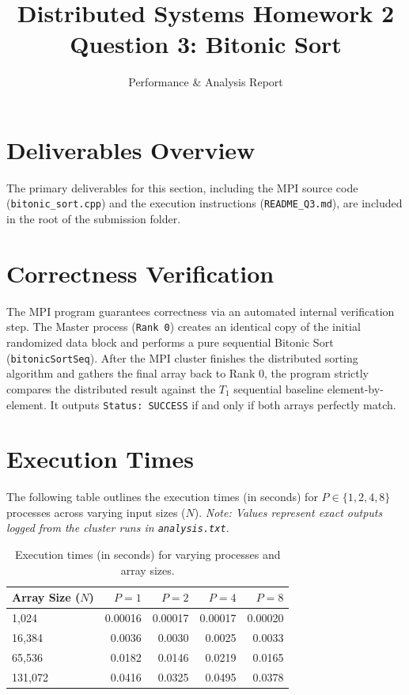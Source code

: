 \documentclass[12pt]{article}
\title{Distributed Systems Homework 2 \\ \Large Question 3: Bitonic Sort}
\author{Performance \& Analysis Report}
\date{}
\begin{document}
\maketitle

\section{Deliverables Overview}
The primary deliverables for this section, including the MPI source code (\texttt{bitonic\_sort.cpp}) and the execution instructions (\texttt{README\_Q3.md}), are included in the root of the submission folder.

\section{Correctness Verification}
The MPI program guarantees correctness via an automated internal verification step. The Master process (\texttt{Rank 0}) creates an identical copy of the initial randomized data block and performs a pure sequential Bitonic Sort (\texttt{bitonicSortSeq}). After the MPI cluster finishes the distributed sorting algorithm and gathers the final array back to Rank 0, the program strictly compares the distributed result against the $T_1$ sequential baseline element-by-element. It outputs \texttt{Status: SUCCESS} if and only if both arrays perfectly match.

\section{Execution Times}
The following table outlines the execution times (in seconds) for $P \in \{1, 2, 4, 8\}$ processes across varying input sizes ($N$). \textit{Note: Values represent exact outputs logged from the cluster runs in \texttt{analysis.txt}.}

\begin{table}[h!]
\centering
\begin{tabular}{@{}lrrrr@{}}
\toprule
\textbf{Array Size ($N$)} & \textbf{$P=1$} & \textbf{$P=2$} & \textbf{$P=4$} & \textbf{$P=8$} \\ \midrule
1,024 & 0.00016 & 0.00017 & 0.00017 & 0.00020 \\
16,384 & 0.0036 & 0.0030 & 0.0025 & 0.0033 \\
65,536 & 0.0182 & 0.0146 & 0.0219 & 0.0165 \\
131,072 & 0.0416 & 0.0325 & 0.0495 & 0.0378 \\ \bottomrule
\end{tabular}
\caption{Execution times (in seconds) for varying processes and array sizes.}
\end{table}
\end{document}
